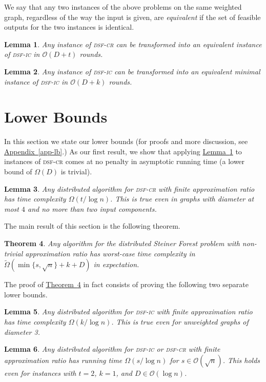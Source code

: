\documentclass[letterpaper,11pt]{article}
\newtheorem{theorem}{Theorem}[section]
\newtheorem{lemma}[theorem]{Lemma}
\newcommand{\namedref}[2]{\hyperref[#2]{#1~\ref*{#2}}}
\newcommand{\appendixref}[1]{\namedref{Appendix}{#1}}
\newcommand{\theoremref}[1]{\namedref{Theorem}{#1}}
\newcommand{\lemmaref}[1]{\namedref{Lemma}{#1}}
\newcommand{\BO}{\mathcal{O}}
\newcommand{\sfcr}{\textsc{dsf-cr}\xspace}
\newcommand{\sfic}{\textsc{dsf-ic}\xspace}
\begin{document}
We say that any two instances of the above problems on the same
weighted graph, regardless of the way the input is given, are
\emph{equivalent} if the set of feasible outputs for the two instances
is identical.
\begin{lemma}\label{lemma:transform_to_input}
Any instance of \sfcr can be transformed into an
  equivalent instance of \sfic in $\BO(D+t)$ rounds.
\end{lemma}

\begin{lemma}\label{lemma:transform_to_minimal}
Any instance of \sfic can be transformed into
an equivalent minimal instance of \sfic in $\BO(D+k)$ rounds.
\end{lemma}

\section{Lower Bounds}
\label{sec-lb}


In this section we state our lower bounds (for proofs and more
discussion, see \appendixref{app-lb}.) 
As our first result,
we show that applying \lemmaref{lemma:transform_to_input} to
instances of \sfcr comes at no penalty in asymptotic running time (a lower bound
of $\Omega(D)$ is trivial). 
\begin{lemma}
\label{lem-lb1}
  Any distributed algorithm for \sfcr with finite approximation ratio
  has time complexity $\Omega(t/\log n)$. This is true even in graphs
  with diameter at most $4$ and no more than two input components.
\end{lemma}

The main result of this section is the following theorem.
\begin{theorem}
\label{thm-lb}
  Any algorithm for the distributed Steiner Forest problem with non-trivial
  approximation ratio has worst-case time complexity in
  $\tilde{\Omega}(\min\{s,\sqrt{n}\}+k+D)$ in expectation.
\end{theorem}
The proof of \theoremref{thm-lb} in fact consists of proving the following two
separate lower bounds.



\begin{lemma}\label{lem:lower_k}
  Any distributed algorithm for \sfic with finite approximation ratio
  has time complexity $\Omega(k/\log n)$. This is true even for
  unweighted graphs of diameter 3.
\end{lemma}

\begin{lemma}\label{lem:lower_s}
  Any distributed algorithm for \sfic or \sfcr with finite approximation ratio
  has running time $\Omega(s/\log n)$ for $s\in
  \BO(\sqrt{n})$. This holds  even for instances with $t=2$, $k=1$,
  and $D\in \BO(\log n)$.
\end{lemma}
\end{document}
